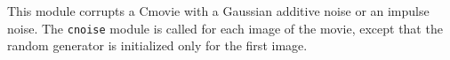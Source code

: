 This module corrupts a Cmovie with a Gaussian additive noise or an
impulse noise. The \verb+cnoise+ module is called for each image
of the movie, except that the random generator is initialized
only for the first image.
